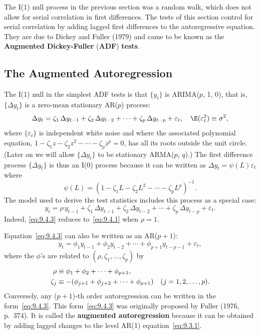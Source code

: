 
The I(1) null process in the previous section was a random walk, which does not
allow for serial correlation in first differences. The tests of this section control for
serial correlation by adding lagged first differences to the autoregressive equation.
They are due to Dickey and Fuller (1979) and came to be known as the \textbf{Augmented
Dickey-Fuller} (\textbf{ADF}) \textbf{tests}.

\subsection*{The Augmented Autoregression}

The I(1) null in the simplest ADF tests is that $\{y_t\}$ is ARIMA($p$, 1, 0), that is, $\{\Delta y_t\}$
is a zero-mean stationary AR($p$) process:
\begin{equation}
\label{eq:9.4.1}
\Delta y_t = \zeta_1\,\Delta y_{t-1} + \zeta_2\,\Delta y_{t-2} + \cdots + \zeta_p\,\Delta y_{t-p} + \varepsilon_t,
\quad \E(\varepsilon_t^2) \equiv \sigma^2,
\end{equation}
where $\{\varepsilon_t\}$ is independent white noise and where the associated polynomial equation, $1 - \zeta_1 z - \zeta_2 z^2 - \cdots - \zeta_p z^p = 0$, has all its roots outside the unit circle. (Later
on we will allow $\{\Delta y_t\}$ to be stationary ARMA($p$, $q$).) The first difference process
$\{\Delta y_t\}$ is thus an I(0) process because it can be written as $\Delta y_t = \psi(L)\varepsilon_t$ where
\begin{equation}
\label{eq:9.4.2}
\psi(L) = (1 - \zeta_1 L - \zeta_2 L^2 - \cdots - \zeta_p L^p)^{-1}.
\end{equation}
The model used to derive the test statistics includes this process as a special case:
\begin{equation}
\label{eq:9.4.3}
y_t = \rho\, y_{t-1} + \zeta_1\,\Delta y_{t-1} + \zeta_2\,\Delta y_{t-2} + \cdots + \zeta_p\,\Delta y_{t-p} + \varepsilon_t.
\end{equation}
Indeed, \eqref{eq:9.4.3} reduces to~\eqref{eq:9.4.1} when $\rho = 1$.

Equation~\eqref{eq:9.4.3} can also be written as an AR($p+1$):
\begin{equation}
\label{eq:9.4.4}
y_t = \phi_1 y_{t-1} + \phi_2 y_{t-2} + \cdots + \phi_{p+1} y_{t-p-1} + \varepsilon_t,
\end{equation}
where the $\phi$'s are related to $(\rho, \zeta_1, \ldots, \zeta_p)$ by
\begin{align}
\rho &\equiv \phi_1 + \phi_2 + \cdots + \phi_{p+1}, \notag \\
\zeta_j &\equiv -(\phi_{j+1} + \phi_{j+2} + \cdots + \phi_{p+1})
\quad (j = 1, 2, \ldots, p).
\label{eq:9.4.5}
\end{align}
Conversely, any ($p+1$)-th order autoregression can be written in the form~\eqref{eq:9.4.3}.
This form~\eqref{eq:9.4.3} was originally proposed by Fuller (1976, p.~374). It is called the
\textbf{augmented autoregression} because it can be obtained by adding lagged changes
to the level AR(1) equation~\eqref{eq:9.3.1}.

